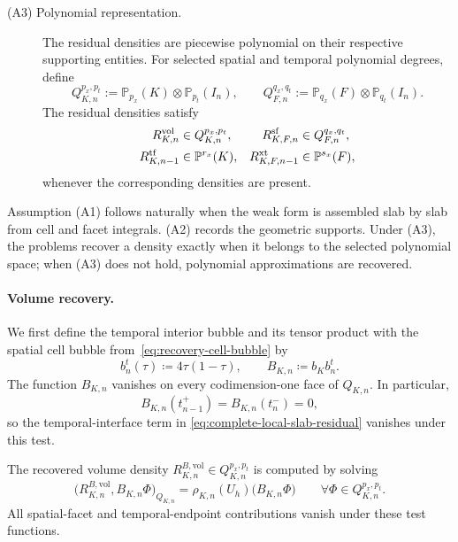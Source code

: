 \begin{description}
\item[(A3) Polynomial representation.]
The residual densities are piecewise polynomial on their respective supporting entities. For selected spatial and temporal polynomial degrees, define
\[
Q_{K,n}^{p_x,p_t}
  := \mathbb{P}_{p_x}(K)\otimes\mathbb{P}_{p_t}(I_n),
\qquad
Q_{F,n}^{q_x,q_t}
  := \mathbb{P}_{q_x}(F)\otimes\mathbb{P}_{q_t}(I_n).
\]
The residual densities satisfy
\begin{align}
  R_{K,n}^{\mathrm{vol}}
  &\in Q_{K,n}^{p_x,p_t},
  &
  R_{K,F,n}^{\mathrm{sf}}
  &\in Q_{F,n}^{q_x,q_t},
  \notag\\
  R_{K,n-1}^{\mathrm{tf}}
  &\in \mathbb P^{r_x}(K),
  &
  R_{K,F,n-1}^{\mathrm{xt}}
  &\in \mathbb P^{s_x}(F),
  \label{eq:space-time-polynomial-representability}
\end{align}
whenever the corresponding densities are present.
\end{description}

Assumption (A1) follows naturally when the weak form is assembled slab by slab from cell and facet integrals. (A2) records the geometric supports. Under (A3), the problems recover a density exactly when it belongs to the selected polynomial space; when (A3) does not hold, polynomial approximations are recovered.


\paragraph{Volume recovery.}
We first define the temporal interior bubble and its tensor product with the spatial cell bubble from~\eqref{eq:recovery-cell-bubble} by
\begin{equation}
  b_n^t(\tau)\coloneqq 4\tau(1-\tau),
  \qquad
  B_{K,n}\coloneqq b_Kb_n^t.
  \label{eq:space-time-volume-bubble}
\end{equation}
The function \(B_{K,n}\) vanishes on every codimension-one face of \(Q_{K,n}\). In particular,
\[
  B_{K,n}(t_{n-1}^{+})
  =
  B_{K,n}(t_n^{-})
  =
  0,
\]
so the temporal-interface term in \eqref{eq:complete-local-slab-residual} vanishes under this test.

The recovered volume density \(R_{K,n}^{B,\mathrm{vol}}\in Q_{K,n}^{p_x,p_t}\) is computed by solving
\begin{equation}
  \bigl(
    R_{K,n}^{B,\mathrm{vol}},
    B_{K,n}\Phi
  \bigr)_{Q_{K,n}}
  =
  \rho_{K,n}(U_h)\bigl(B_{K,n}\Phi\bigr)
  \qquad
  \forall\Phi\in Q_{K,n}^{p_x,p_t}.
  \label{eq:space-time-volume-projection}
\end{equation}
All spatial-facet and temporal-endpoint contributions vanish under these test functions.

